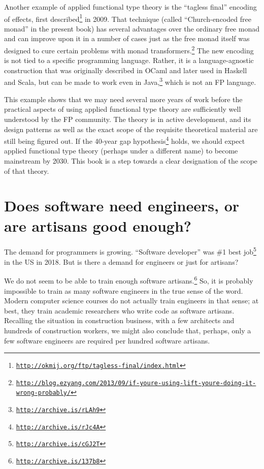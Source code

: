 Another example of applied functional type theory is the  \textsf{``}tagless
final\textsf{''} encoding of effects, first described\footnote{\texttt{\href{http://okmij.org/ftp/tagless-final/index.html}{http://okmij.org/ftp/tagless-final/index.html}}}
in 2009. That technique (called \textsf{``}Church-encoded free monad\textsf{''}
in the present book) has several advantages over the ordinary free
monad and can improve upon it in a number of cases \textemdash{} just
as the free monad itself was designed to cure certain problems with
monad transformers.\footnote{\texttt{\href{http://blog.ezyang.com/2013/09/if-youre-using-lift-youre-doing-it-wrong-probably/}{http://blog.ezyang.com/2013/09/if-youre-using-lift-youre-doing-it-wrong-probably/}}}
The new encoding is not tied to a specific programming language. Rather,
it is a language-agnostic construction that was originally described
in OCaml and later used in Haskell and Scala, but can be made to work
even in Java,\footnote{\texttt{\href{http://archive.is/rLAh9}{http://archive.is/rLAh9}}}
which is not an FP language.

This example shows that we may need several more years of work before
the practical aspects of using applied functional type theory are
sufficiently well understood by the FP community. The theory is in
active development, and its design patterns \textemdash{} as well
as the exact scope of the requisite theoretical material \textemdash{}
are still being figured out. If the 40-year gap hypothesis\footnote{\texttt{\href{http://archive.is/rJc4A}{http://archive.is/rJc4A}}}
holds, we should expect applied functional type theory (perhaps under
a different name) to become mainstream by 2030. This book is a step
towards a clear designation of the scope of that theory.

\section{Does software need engineers, or are artisans good enough? }

The demand for programmers is growing. \textsf{``}Software developer\textsf{''} was
\#1 best job\footnote{\texttt{\href{http://archive.is/cGJ2T}{http://archive.is/cGJ2T}}}
in the US in 2018. But is there a demand for engineers or just for
artisans?

We do not seem to be able to train enough software artisans.\footnote{\texttt{\href{http://archive.is/137b8}{http://archive.is/137b8}}}
So, it is probably impossible to train as many software engineers
in the true sense of the word. Modern computer science courses do
not actually train engineers in that sense; at best, they train academic
researchers who write code as software artisans. Recalling the situation
in construction business, with a few architects and hundreds of construction
workers, we might also conclude that, perhaps, only a few software
engineers are required per hundred software artisans.

